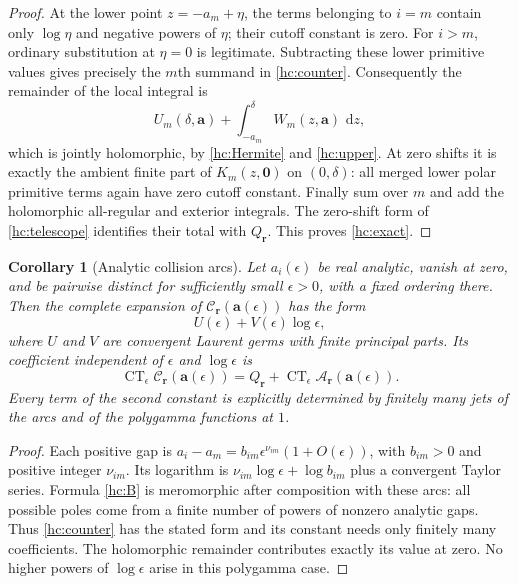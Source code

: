 \documentclass[11pt,a4paper]{article}
\numberwithin{equation}{section}
\newtheorem{corollary}[theorem]{Corollary}
\theoremstyle{definition}
\theoremstyle{remark}
\DeclareMathOperator{\CT}{CT}
\newcommand{\dd}{\,\mathrm d}
\begin{document}
\begin{proof}
At the lower point $z=-a_m+\eta$, the terms belonging to $i=m$ contain
only $\log\eta$ and negative powers of $\eta$; their cutoff constant
is zero. For $i>m$, ordinary substitution at $\eta=0$ is legitimate.
Subtracting these lower primitive values gives precisely the $m$th
summand in \eqref{hc:counter}. Consequently the remainder of the local
integral is
\[
 U_m(\delta,\boldsymbol a)
       +\int_{-a_m}^{\delta}W_m(z,\boldsymbol a)\,\dd z,
\]
which is jointly holomorphic, by \eqref{hc:Hermite} and
\eqref{hc:upper}. At zero shifts it is exactly the ambient finite part
of $K_m(z,\boldsymbol0)$ on $(0,\delta)$: all merged lower polar
primitive terms again have zero cutoff constant. Finally sum over $m$
and add the holomorphic all-regular and exterior integrals. The
zero-shift form of \eqref{hc:telescope} identifies their total with
$Q_{\boldsymbol r}$. This proves \eqref{hc:exact}.
\end{proof}

\begin{corollary}[Analytic collision arcs]\label{hc:arcs}
Let $a_i(\epsilon)$ be real analytic, vanish at zero, and be pairwise
distinct for sufficiently small $\epsilon>0$, with a fixed ordering
there. Then the complete expansion of
$\mathcal C_{\boldsymbol r}(\boldsymbol a(\epsilon))$ has the form
\[
 U(\epsilon)+V(\epsilon)\log\epsilon,
\]
where $U$ and $V$ are convergent Laurent germs with finite principal
parts. Its coefficient independent of $\epsilon$ and $\log\epsilon$ is
\begin{equation}\label{hc:arc-constant}
 \CT_{\epsilon}\mathcal C_{\boldsymbol r}(\boldsymbol a(\epsilon))
 =Q_{\boldsymbol r}
       +\CT_{\epsilon}\mathcal A_{\boldsymbol r}(\boldsymbol a(\epsilon)).
\end{equation}
Every term of the second constant is explicitly determined by finitely
many jets of the arcs and of the polygamma functions at $1$.
\end{corollary}

\begin{proof}
Each positive gap is
$a_i-a_m=b_{im}\epsilon^{\nu_{im}}(1+O(\epsilon))$, with
$b_{im}>0$ and positive integer $\nu_{im}$. Its logarithm is
$\nu_{im}\log\epsilon+\log b_{im}$ plus a convergent Taylor series.
Formula \eqref{hc:B} is meromorphic after composition with these arcs:
all possible poles come from a finite number of powers of nonzero
analytic gaps. Thus \eqref{hc:counter} has the stated form and its
constant needs only finitely many coefficients. The holomorphic
remainder contributes exactly its value at zero. No higher powers
of $\log\epsilon$ arise in this polygamma case.
\end{proof}
\end{document}
